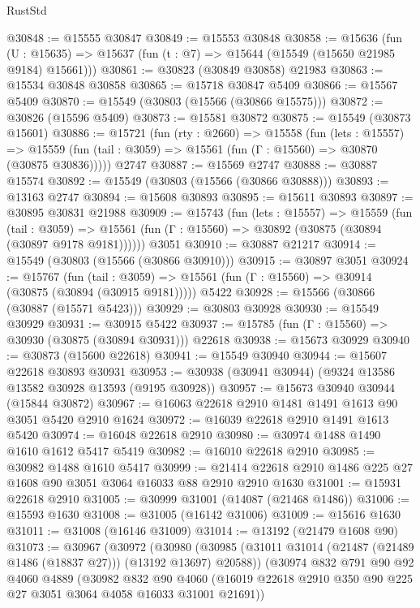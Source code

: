 \begin{lexlean}{RustStd}
\begin{coremodule}
@30848 := @15555 @30847
@30849 := @15553 @30848
@30858 := @15636
    (fun (U : @15635) => @15637 (fun (t : @7) => @15644 (@15549 (@15650 @21985 @9184) @15661)))
@30861 := @30823 (@30849 @30858) @21983
@30863 := @15534 @30848 @30858
@30865 := @15718 @30847 @5409
@30866 := @15567 @5409
@30870 := @15549 (@30803 (@15566 (@30866 @15575)))
@30872 := @30826 (@15596 @5409)
@30873 := @15581 @30872
@30875 := @15549 (@30873 @15601)
@30886 := @15721
    (fun (rty : @2660) =>
    @15558
      (fun (lets : @15557) =>
      @15559 (fun (tail : @3059) => @15561 (fun (Γ : @15560) => @30870 (@30875 @30836)))))
    @2747
@30887 := @15569 @2747
@30888 := @30887 @15574
@30892 := @15549 (@30803 (@15566 (@30866 @30888)))
@30893 := @13163 @2747
@30894 := @15608 @30893
@30895 := @15611 @30893
@30897 := @30895 @30831 @21988
@30909 := @15743
    (fun (lets : @15557) =>
    @15559
      (fun (tail : @3059) =>
      @15561 (fun (Γ : @15560) => @30892 (@30875 (@30894 (@30897 @9178 @9181))))))
    @3051
@30910 := @30887 @21217
@30914 := @15549 (@30803 (@15566 (@30866 @30910)))
@30915 := @30897 @3051
@30924 := @15767
    (fun (tail : @3059) => @15561 (fun (Γ : @15560) => @30914 (@30875 (@30894 (@30915 @9181)))))
    @5422
@30928 := @15566 (@30866 (@30887 (@15571 @5423)))
@30929 := @30803 @30928
@30930 := @15549 @30929
@30931 := @30915 @5422
@30937 := @15785 (fun (Γ : @15560) => @30930 (@30875 (@30894 @30931))) @22618
@30938 := @15673 @30929
@30940 := @30873 (@15600 @22618)
@30941 := @15549 @30940
@30944 := @15607 @22618 @30893 @30931
@30953 := @30938 (@30941 @30944) (@9324 @13586 @13582 @30928 @13593 (@9195 @30928))
@30957 := @15673 @30940 @30944 (@15844 @30872)
@30967 := @16063 @22618 @2910 @1481 @1491 @1613 @90 @3051 @5420 @2910 @1624
@30972 := @16039 @22618 @2910 @1491 @1613 @5420
@30974 := @16048 @22618 @2910
@30980 := @30974 @1488 @1490 @1610 @1612 @5417 @5419
@30982 := @16010 @22618 @2910
@30985 := @30982 @1488 @1610 @5417
@30999 := @21414 @22618 @2910 @1486 @225 @27 @1608 @90 @3051 @3064 @16033 @88 @2910 @2910 @1630
@31001 := @15931 @22618 @2910
@31005 := @30999 @31001 (@14087 (@21468 @1486))
@31006 := @15593 @1630
@31008 := @31005 (@16142 @31006)
@31009 := @15616 @1630
@31011 := @31008 (@16146 @31009)
@31014 := @13192 (@21479 @1608 @90)
@31073 := @30967
    (@30972
      (@30980
        (@30985 (@31011 @31014 (@21487 (@21489 @1486 (@18837 @27))) (@13192 @13697) @20588))
        (@30974
          @832
          @791
          @90
          @92
          @4060
          @4889
          (@30982
            @832
            @90
            @4060
            (@16019 @22618 @2910 @350 @90 @225 @27 @3051 @3064 @4058 @16033 @31001 @21691))

\end{coremodule}
\end{lexlean}
